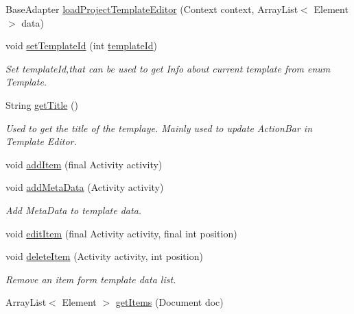 \begin{DoxyCompactItemize}
\item 
Base\+Adapter \hyperlink{classorg_1_1buildmlearn_1_1toolkit_1_1templates_1_1FlashTemplate_aeee0f28447c5d3c1d5c7c4ef8bb2ae3e}{load\+Project\+Template\+Editor} (Context context, Array\+List$<$ Element $>$ data)
\item 
void \hyperlink{classorg_1_1buildmlearn_1_1toolkit_1_1templates_1_1FlashTemplate_a4d44f233e7bd0b4d480583c1e3aa2d18}{set\+Template\+Id} (int \hyperlink{classorg_1_1buildmlearn_1_1toolkit_1_1templates_1_1FlashTemplate_a00df07dcf4f09799ccba120c9ef45e46}{template\+Id})
\begin{DoxyCompactList}\small\item\em Set template\+Id,that can be used to get Info about current template from enum Template. \end{DoxyCompactList}\item 
String \hyperlink{classorg_1_1buildmlearn_1_1toolkit_1_1templates_1_1FlashTemplate_aed263c384b73d5d700e4144a97007245}{get\+Title} ()
\begin{DoxyCompactList}\small\item\em Used to get the title of the templaye. Mainly used to update Action\+Bar in Template Editor. \end{DoxyCompactList}\item 
void \hyperlink{classorg_1_1buildmlearn_1_1toolkit_1_1templates_1_1FlashTemplate_a21bb61da956f40b08ae38bedb329639f}{add\+Item} (final Activity activity)
\item 
void \hyperlink{classorg_1_1buildmlearn_1_1toolkit_1_1templates_1_1FlashTemplate_a38adf2d900315cadbee7160e8a06bdbd}{add\+Meta\+Data} (Activity activity)
\begin{DoxyCompactList}\small\item\em Add Meta\+Data to template data. \end{DoxyCompactList}\item 
void \hyperlink{classorg_1_1buildmlearn_1_1toolkit_1_1templates_1_1FlashTemplate_a83e541cdb95abf421a55a269f67f4e2f}{edit\+Item} (final Activity activity, final int position)
\item 
void \hyperlink{classorg_1_1buildmlearn_1_1toolkit_1_1templates_1_1FlashTemplate_a9fafe16479379a494bcccde6811d909f}{delete\+Item} (Activity activity, int position)
\begin{DoxyCompactList}\small\item\em Remove an item form template data list. \end{DoxyCompactList}\item 
Array\+List$<$ Element $>$ \hyperlink{classorg_1_1buildmlearn_1_1toolkit_1_1templates_1_1FlashTemplate_adac9ece8aeee9a46cd8b7ac97ba9aab0}{get\+Items} (Document doc)

\end{DoxyCompactItemize}
